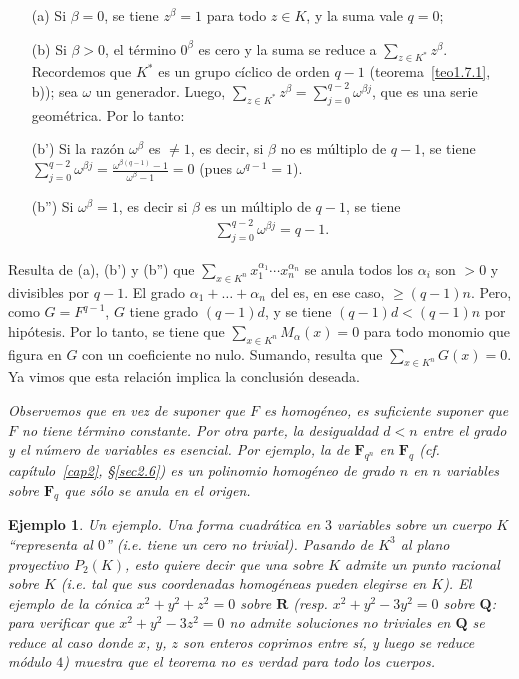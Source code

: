 \documentclass[bibtotoc,leqno,spanish]{amsbook}
\let\emph\relax %
\newcommand{\RR}{\mathbf{R}}
\newcommand{\QQ}{\mathbf{Q}}
\newcommand{\FF}{\mathbf{F}}
\numberwithin{equation}{section}
\newenvironment{comm}%
	{\begin{list}{}{\setlength{\leftmargin}{2\parindent}\setlength{\topsep}{\baselineskip}}\item\itshape}
	{\end{list}}
\theoremstyle{note}
\theoremstyle{note}
\theoremstyle{rem}
\newtheorem*{example*}{Ejemplo}
\numberwithin{theorem}{section}
\numberwithin{proposition}{section}
\numberwithin{definition}{section}
\numberwithin{lemma}{section}
\numberwithin{corollary}{section}
\numberwithin{example}{section}
\numberwithin{footnote}{section}%
\begin{document}
\begin{enumerate}
\item[(a)] Si $\beta = 0$, se tiene $z^{\beta} =1$ para todo $z\in K$, y la suma vale $q = 0$;

\item[(b)] Si $\beta > 0$, el t\'ermino $0^{\beta}$ es cero y la suma se reduce a $\sum_{z\in K^{*}}z^{\beta}$. Recordemos
que $K^{*}$ es un grupo c\'iclico de orden $q-1$ (teorema~\ref{teo1.7.1}, b));
sea $\omega$ un generador. Luego,
$\sum_{z\in K^{*}}z^{\beta} = \sum_{j=0}^{q-2}\omega^{\beta j}$, que es una serie geom\'etrica. Por lo tanto:

\item[(b')] Si la raz\'on $\omega^{\beta}$ es $\neq 1$, es decir, si $\beta$ no es m\'ultiplo de $q-1$, se tiene
$\sum_{j=0}^{q-2}\omega^{\beta j} = \frac{\omega^{\beta(q-1)}-1}{\omega^{\beta}-1} = 0$ (pues $\omega^{q-1} = 1$).

\item[(b'')] Si $\omega^{\beta} = 1$, es decir si $\beta$ es un m\'ultiplo de $q-1$, se tiene
\begin{gather*}
\sum_{j=0}^{q-2}\omega^{\beta j} = q-1.
\end{gather*}
\end{enumerate}
Resulta de (a), (b') y (b'') que $\sum_{x\in K^{n}}x_{1}^{\alpha_{1}}\cdots x_{n}^{\alpha_{n}}$ se anula \emph{salvo
si} todos los $\alpha_{i}$ son $>0$ y divisibles por $q-1$. El grado $\alpha_{1}+\dots+\alpha_{n}$ del
es, en ese caso, $\geq (q-1)n$. Pero, como $G = F^{q-1}$, $G$ tiene grado $(q-1)d$, y se tiene
$(q-1)d < (q-1)n$ por hip\'otesis. Por lo tanto, se tiene que $\sum_{x\in K^{n}}M_{\alpha}(x) = 0$ para todo
monomio que figura en $G$ con un coeficiente no nulo. Sumando, resulta que $\sum_{x\in K^{n}}G(x) = 0$. Ya vimos
que esta relaci\'on implica la conclusi\'on deseada.

\begin{comm}
Observemos que en vez de suponer que $F$ es homog\'eneo, es suficiente suponer que $F$ no tiene t\'ermino constante.
Por otra parte, la desigualdad \emph{estricta} $d < n$ entre el grado y el n\'umero de variables es esencial.
Por ejemplo, la \emph{norma} de $\FF_{q^{n}}$ en $\FF_{q}$ (cf. cap\'itulo~\ref{cap2}, \S\ref{sec2.6}) es un polinomio
homog\'eneo de grado $n$ en $n$ variables sobre $\FF_{q}$ que s\'olo se anula en el origen.
\end{comm}

\begin{example*}
{\itshape Un ejemplo.} Una forma cuadr\'atica en $3$ variables sobre un cuerpo \emph{finito} $K$
``representa al $0$'' (i.e. tiene un cero no trivial). Pasando de $K^{3}$ al plano proyectivo
$P_{2}(K)$, esto quiere decir que una \emph{c\'onica} sobre $K$ admite un punto racional sobre $K$
(i.e. tal que sus coordenadas homog\'eneas pueden elegirse en $K$). El ejemplo de la c\'onica
$x^{2}+y^{2}+z^{2}=0$ sobre $\RR$ (resp. $x^{2}+y^{2}-3y^{2}=0$ sobre $\QQ$: para verificar que
$x^{2}+y^{2}-3z^{2}=0$ no admite soluciones no triviales en $\QQ$ se reduce al caso donde $x$, $y$, $z$
son enteros coprimos entre s\'i, y luego se reduce m\'odulo $4$) muestra que el teorema no es verdad para
todo los cuerpos.
\end{example*}
\end{document}
